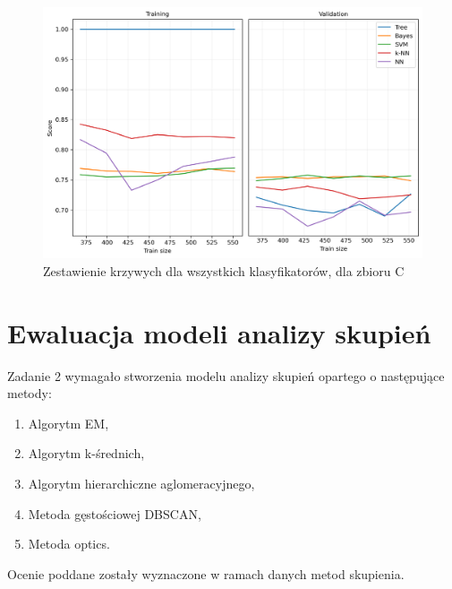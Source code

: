 \documentclass[a4paper,11pt]{article}
\begin{document}
\begin{figure}[H]
    \centering
    \includegraphics[width=\textwidth]{images3/learning_curves/learning_curve_Diabetes.png}
    \caption{Zestawienie krzywych dla wszystkich klasyfikatorów, dla zbioru C}
    \label{fig:learning_curve_c}
\end{figure}




\section{Ewaluacja modeli analizy skupień}
Zadanie 2 wymagało stworzenia modelu analizy skupień opartego o następujące metody:

\begin{enumerate}
    \item Algorytm EM,
    \item Algorytm k-średnich,
    \item Algorytm hierarchiczne aglomeracyjnego,
    \item Metoda gęstościowej DBSCAN,
    \item Metoda optics.
\end{enumerate}

Ocenie poddane zostały wyznaczone w ramach danych metod skupienia.
\end{document}
